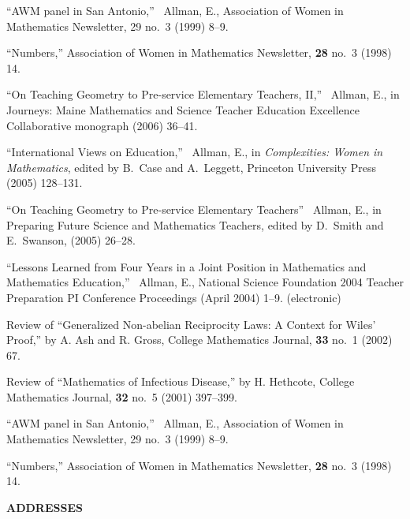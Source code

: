 \documentclass[10pt]{report}
\begin{document}
{{\begin{revnumerate}[8]
\item
``AWM panel in San Antonio,'' \ Allman, E., Association of Women in
Mathematics Newsletter, 29 no.~3 (1999) 8--9.

\item
``Numbers,'' Association of Women in Mathematics Newsletter, {\bf 28}
no.~3 (1998) 14.
\end{revnumerate}
}
{
``On Teaching Geometry to Pre-service Elementary Teachers, II,'' \
Allman, E., in Journeys: Maine Mathematics and Science Teacher
Education Excellence Collaborative monograph (2006) 36--41.

``International Views on Education,'' \ Allman, E., in {\it
Complexities: Women in Mathematics}, edited by B.~Case and
A.~Leggett, Princeton University Press (2005) 128--131.

``On Teaching Geometry to Pre-service Elementary Teachers'' \ Allman,
E., in Preparing Future Science and Mathematics Teachers, edited by
D.~Smith and E.~Swanson, (2005) 26--28.

``Lessons Learned from Four Years in a Joint Position in Mathematics
and Mathematics Education,'' \ Allman, E., National Science
Foundation 2004 Teacher Preparation PI Conference Proceedings (April
2004) 1--9. (electronic)

Review of ``Generalized Non-abelian Reciprocity Laws: A Context for
Wiles' Proof,'' by A. Ash and R. Gross, College Mathematics Journal,
{\bf 33} no.~1 (2002) 67.

Review of ``Mathematics of Infectious Disease,'' by H.  Hethcote,
College Mathematics Journal, {\bf 32} no.~5 (2001) 397--399.

``AWM panel in San Antonio,'' \ Allman, E., Association of Women in
Mathematics Newsletter, 29 no.~3 (1999) 8--9.

``Numbers,'' Association of Women in Mathematics Newsletter, {\bf 28}
no.~3 (1998) 14.
}

\mbox{}


}

{\bf  ADDRESSES}

\medskip
\end{document}
